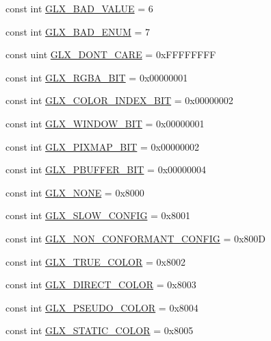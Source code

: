 \begin{DoxyCompactItemize}
\item 
const int \hyperlink{class_tao_1_1_platform_1_1_x11_1_1_glx_abf751a9967b1a5fb0d1f672a363e21b6}{GLX\_\-BAD\_\-VALUE} = 6
\item 
const int \hyperlink{class_tao_1_1_platform_1_1_x11_1_1_glx_a78b528f44c6912a84341530622a4285e}{GLX\_\-BAD\_\-ENUM} = 7
\item 
const uint \hyperlink{class_tao_1_1_platform_1_1_x11_1_1_glx_a11cda7d73face7eabc20e12fb7d990a1}{GLX\_\-DONT\_\-CARE} = 0xFFFFFFFF
\item 
const int \hyperlink{class_tao_1_1_platform_1_1_x11_1_1_glx_a46959909212bb7c1157ce812e621f2f6}{GLX\_\-RGBA\_\-BIT} = 0x00000001
\item 
const int \hyperlink{class_tao_1_1_platform_1_1_x11_1_1_glx_a056beffa48c29bc3c7fa561438a7958d}{GLX\_\-COLOR\_\-INDEX\_\-BIT} = 0x00000002
\item 
const int \hyperlink{class_tao_1_1_platform_1_1_x11_1_1_glx_a276a399a7aaf0d9b0d1c627ec02860b3}{GLX\_\-WINDOW\_\-BIT} = 0x00000001
\item 
const int \hyperlink{class_tao_1_1_platform_1_1_x11_1_1_glx_abb8f9b7e88bfa3589924a83107ba014d}{GLX\_\-PIXMAP\_\-BIT} = 0x00000002
\item 
const int \hyperlink{class_tao_1_1_platform_1_1_x11_1_1_glx_a64b5d49bef52b11f4ad5bd1ef90e84ca}{GLX\_\-PBUFFER\_\-BIT} = 0x00000004
\item 
const int \hyperlink{class_tao_1_1_platform_1_1_x11_1_1_glx_a51737dacb361ecb25c36db057d0646d1}{GLX\_\-NONE} = 0x8000
\item 
const int \hyperlink{class_tao_1_1_platform_1_1_x11_1_1_glx_ae00dd5da604664ab67feebfd716fae89}{GLX\_\-SLOW\_\-CONFIG} = 0x8001
\item 
const int \hyperlink{class_tao_1_1_platform_1_1_x11_1_1_glx_a1e338432449cbc213a3a4c2673123ca0}{GLX\_\-NON\_\-CONFORMANT\_\-CONFIG} = 0x800D
\item 
const int \hyperlink{class_tao_1_1_platform_1_1_x11_1_1_glx_a4df6c260ab08a6d229d3d407e2ba1dc2}{GLX\_\-TRUE\_\-COLOR} = 0x8002
\item 
const int \hyperlink{class_tao_1_1_platform_1_1_x11_1_1_glx_ae7c06440f69e30d7f700e19c41c30a96}{GLX\_\-DIRECT\_\-COLOR} = 0x8003
\item 
const int \hyperlink{class_tao_1_1_platform_1_1_x11_1_1_glx_a98cc081d53938af1a9ed0512a1b8ed98}{GLX\_\-PSEUDO\_\-COLOR} = 0x8004
\item 
const int \hyperlink{class_tao_1_1_platform_1_1_x11_1_1_glx_a1303f2e0f2f13f0a1e5ffa33a22ea888}{GLX\_\-STATIC\_\-COLOR} = 0x8005

\end{DoxyCompactItemize}
